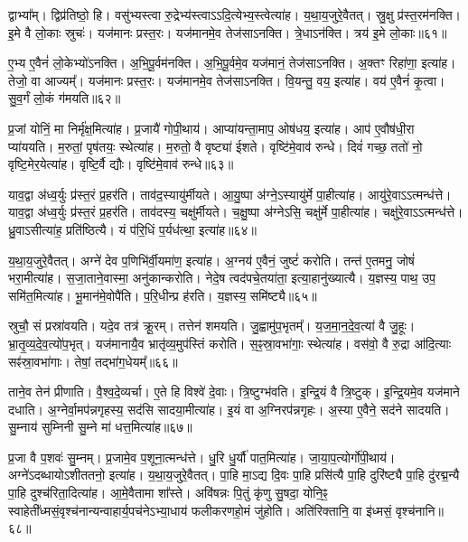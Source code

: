 द्वाभ्या᳚म्।
द्विप्र॑तिष्ठो॒ हि।
वसु॑भ्यस्त्वा रु॒द्रेभ्य॑स्त्वा\-ऽऽदि॒त्येभ्य॒स्त्वेत्या॑ह।
य॒था॒\-य॒जु\-रे॒वै\-तत्।
स्रु॒क्षु प्र॑स्त॒रम॑नक्ति।
इ॒मे वै लो॒काः स्रुचः॑।
यज॑मानः प्रस्त॒रः।
यज॑मानमे॒व तेज॑सा\-ऽनक्ति।
त्रे॒धा\-ऽन॑क्ति।
त्रय॑ इ॒मे लो॒काः॥६१॥\ip

ए॒भ्य ए॒वैनं॑ लो॒केभ्यो॑\-ऽनक्ति।
अ॒भि॒पू॒र्वम॑नक्ति।
अ॒भि॒पू॒र्वमे॒व यज॑मानं॒ तेज॑सा\-ऽनक्ति।
अ॒क्तꣳ रिहा॑णा॒ इत्या॑ह।
तेजो॒ वा आज्यम्᳚।
यज॑मानः प्रस्त॒रः।
यज॑मानमे॒व तेज॑सा\-ऽनक्ति।
वि॒यन्तु॒ वय॒ इत्या॑ह।
वय॑ ए॒वैनं॑ कृ॒त्वा।
सु॒व॒र्गं लो॒कं ग॑मयति॥६२॥\ip

प्र॒जां योनिं॒ मा निर्मृ॑क्ष॒मित्या॑ह।
प्र॒जायै॑ गोपी॒थाय॑।
आप्या॑यन्ता॒माप॒ ओष॑धय॒ इत्या॑ह।
आप॑ ए॒वौष॑धी॒रा प्या॑ययति।
म॒रुतां॒ पृष॑तयः॒ स्थेत्या॑ह।
म॒रुतो॒ वै वृष्ट्या॑ ईशते।
वृष्टि॑मे॒वाव॑ रुन्धे।
दिवं॑ गच्छ॒ ततो॑ नो॒ वृष्टि॒मेर॒येत्या॑ह।
वृष्टि॒र्वै द्यौः।
वृष्टि॑मे॒वाव॑ रुन्धे॥६३॥\ip

याव॒द्वा अ॑ध्व॒र्युः प्र॑स्त॒रं प्र॒हर॑ति।
ताव॑द॒स्यायु॑र्मीयते।
आ॒यु॒ष्पा अ॑ग्ने॒\-ऽस्यायु॑र्मे पा॒हीत्या॑ह।
आयु॑रे॒वाऽऽत्मन्ध॑त्ते।
याव॒द्वा अ॑ध्व॒र्युः प्र॑स्त॒रं प्र॒हर॑ति।
ताव॑दस्य॒ चक्षु॑र्मीयते।
च॒क्षु॒ष्पा अ॑ग्नेऽसि॒ चक्षु॑र्मे पा॒हीत्या॑ह।
चक्षु॑रे॒वाऽऽत्मन्ध॑त्ते।
ध्रु॒वा\-ऽसीत्या॑ह॒ प्रति॑\-ष्ठित्यै।
यं प॑रि॒धिं प॒र्यध॑त्था॒ इत्या॑ह॥६४॥\ip

य॒था॒\-य॒जु\-रे॒वै\-तत्।
अग्ने॑ देव प॒णिभि॑र्वी॒यमा॑ण॒ इत्या॑ह।
अ॒ग्नय॑ ए॒वैनं॒ जुष्टं॑ करोति।
तन्त॑ ए॒तमनु॒ जोषं॑ भरा॒मीत्या॑ह।
स॒जा॒ताने॒वास्मा॒ अनु॑कान्करोति।
नेदे॒ष त्वद॑पचे॒तया॑ता॒ इत्या॒हानु॑ख्यात्यै।
य॒ज्ञस्य॒ पाथ॒ उप॒ समि॑त॒मित्या॑ह।
भू॒मान॑मे॒वोपै॑ति।
प॒रि॒धीन्प्र ह॑रति।
य॒ज्ञस्य॒ समि॑ष्ट्यै॥६५॥\ip

स्रुचौ॒ सं प्रस्रा॑वयति।
यदे॒व तत्र॑ क्रू॒रम्।
तत्तेन॑ शमयति।
जु॒ह्वामु॑प॒भृतम्᳚।
य॒ज॒मा॒न॒दे॒व॒त्या॑ वै जु॒हूः।
भ्रा॒तृ॒व्य॒दे॒व॒त्यो॑प॒भृत्।
यज॑मानायै॒व भ्रातृ॑व्य॒मुप॑स्तिं करोति।
स॒ꣴ॒स्रा॒वभा॑गाः॒ स्थेत्या॑ह।
वस॑वो॒ वै रु॒द्रा आ॑दि॒त्याः सꣴ॑स्रा॒वभा॑गाः।
तेषां॒ तद्भा॑ग॒धेयम्᳚॥६६॥\ip

ताने॒व तेन॑ प्रीणाति।
वै॒श्व॒दे॒व्यर्चा।
ए॒ते हि विश्वे॑ दे॒वाः।
त्रि॒ष्टुग्भ॑वति।
इ॒न्द्रि॒यं वै त्रि॒ष्टुक्।
इ॒न्द्रि॒यमे॒व यज॑माने दधाति।
अ॒ग्नेर्वा॒मप॑न्नगृहस्य॒ सद॑सि सादया॒मीत्या॑ह।
इ॒यं वा अ॒ग्निरप॑न्नगृहः।
अ॒स्या ए॒वैने॒ सद॑ने सादयति।
सु॒म्नाय॑ सुम्निनी सु॒म्ने मा॑ धत्त॒मित्या॑ह॥६७॥\ip

प्र॒जा वै प॒शवः॑ सु॒म्नम्।
प्र॒जामे॒व प॒शूना॒त्मन्ध॑त्ते।
धु॒रि धु॒र्यौ॑ पात॒मित्या॑ह।
जा॒या॒प॒त्योर्गो॑पी॒थाय॑।
अग्ने॑\-ऽदब्धायो\-ऽशीततनो॒ इत्या॑ह।
य॒था॒\-य॒जु\-रे॒वै\-तत्।
पा॒हि मा॒ऽद्य दि॒वः पा॒हि प्रसि॑त्यै पा॒हि दुरि॑ष्ट्यै पा॒हि दु॑रद्म॒न्यै पा॒हि दुश्च॑रिता॒दित्या॑ह।
आ॒\-मे॒वैतामा शा᳚स्ते।
अवि॑षन्नः पि॒तुं कृ॑णु सु॒षदा॒ योनि॒ꣴ॒ स्वाहेती᳚ध्मसं॒वृश्च॑नान्यन्वाहार्य॒पच॑ने\-ऽभ्या॒धाय॑ फलीकरणहो॒मं जु॑होति।
अति॑रिक्तानि॒ वा इ॑ध्मसं॒ वृश्च॑नानि॥६८॥\ip

